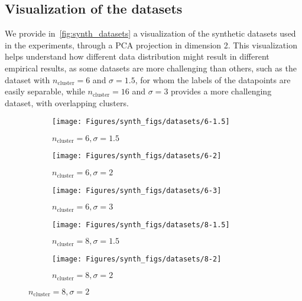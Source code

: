 \subsection{Visualization of the datasets}

We provide in~\autoref{fig:synth_datasets} a visualization of the synthetic datasets used in the experiments, through a PCA projection in dimension 2.
This visualization helps understand how different data distribution might result in different empirical results, as some datasets are more challenging than others, such as the dataset with $n_{\textrm{cluster}} = 6$ and $\sigma = 1.5$, for whom the labels of the datapoints are easily separable, while $n_{\textrm{cluster}} = 16$ and $\sigma = 3$ provides a more challenging dataset, with overlapping clusters.

\begin{figure}[ht]
    \centering
    \begin{subfigure}{0.3\linewidth}
        \centering
        \texttt{[image: Figures/synth\_figs/datasets/6-1.5]}
        \caption{
            $n_{\textrm{cluster}} = 6, \sigma = 1.5$
        }
        \label{fig:6-1.5}
    \end{subfigure}
    \begin{subfigure}{0.3\linewidth}
        \centering
        \texttt{[image: Figures/synth\_figs/datasets/6-2]}
        \caption{
            $n_{\textrm{cluster}} = 6, \sigma = 2$
        }
        \label{fig:6-2}
    \end{subfigure}
    \begin{subfigure}{0.3\linewidth}
        \centering
        \texttt{[image: Figures/synth\_figs/datasets/6-3]}
        \caption{
            $n_{\textrm{cluster}} = 6, \sigma = 3$
        }
        \label{fig:6-3}
    \end{subfigure}
        \begin{subfigure}{0.3\linewidth}
        \centering
        \texttt{[image: Figures/synth\_figs/datasets/8-1.5]}
        \caption{
            $n_{\textrm{cluster}} = 8, \sigma = 1.5$
        }
        \label{fig:8-1.5}
    \end{subfigure}
    \begin{subfigure}{0.3\linewidth}
        \centering
        \texttt{[image: Figures/synth\_figs/datasets/8-2]}
        \caption{
            $n_{\textrm{cluster}} = 8, \sigma = 2$
        }
        \label{fig:8-2}
    \end{subfigure}

\end{figure}
